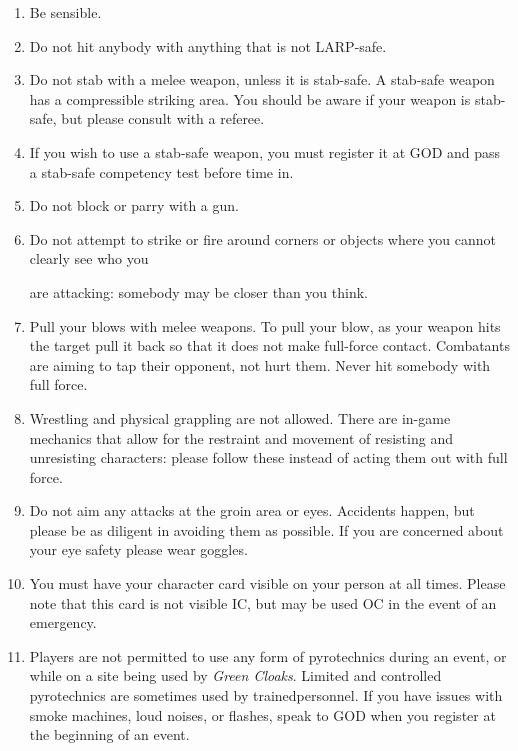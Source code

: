 \documentclass{scrbook}
\begin{document}
\begin{enumerate}[1]

\item Be sensible.

\item Do not hit anybody with anything that is not LARP-safe.

\item Do not stab with a melee weapon, unless it is stab-safe. A stab-safe weapon has a compressible striking area. You should be aware if your weapon is stab-safe, but please consult with a referee.

\item If you wish to use a stab-safe weapon, you must register it at GOD and pass a stab-safe competency test before time in.

\item Do not block or parry with a gun.

\item Do not attempt to strike or fire around corners or objects where you cannot clearly see who you

are attacking: somebody may be closer than you think.

\item Pull your blows with melee weapons. To pull your blow, as your weapon hits the target pull it back so that it does not make full-force contact. Combatants are aiming to tap their opponent, not hurt them. Never hit somebody with full force.

\item Wrestling and physical grappling are not allowed. There are in-game mechanics that allow for the restraint and movement of resisting and unresisting characters: please follow these instead of acting them out with full force.

\item Do not aim any attacks at the groin area or eyes. Accidents happen, but please be as diligent in avoiding them as possible. If you are concerned about your eye safety please wear goggles.

\item You must have your character card visible on your person at all times. Please note that this card is not visible IC, but may be used OC in the event of an emergency.

\item Players are not permitted to use any form of pyrotechnics during an event, or while on a site being used by \textit{Green Cloaks}. Limited and controlled pyrotechnics are sometimes used by trainedpersonnel. If you have issues with smoke machines, loud noises, or flashes, speak to GOD when you register at the beginning of an event.


\end{enumerate}
\end{document}
